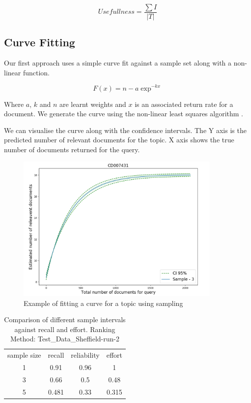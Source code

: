 \begin{equation}
Usefullness = \frac{\sum{I}}{|T|}
\end{equation}
\fi


\subsection{Curve Fitting}

Our first approach uses a simple curve fit against a sample set along with a non-linear function.

\begin{equation}
F(x) = n - a\exp^{-kx}
\end{equation}

Where $a$, $k$ and $n$ are learnt weights and $x$ is an associated return rate for a document. We generate the curve using the non-linear least squares algorithm \cite{leastsqures}. 

We can visualise the curve along with the confidence intervals. The Y axis is the predicted number of relevant documents for the topic. X axis shows the true number of documents returned for the query. 

\begin{figure}[H]
\center
\includegraphics[width=10cm]{figures/curve_fit_example.png}
\caption{Example of fitting a curve for a topic using sampling}
\end{figure}

\begin{table}[H]
\centering
\begin{tabular}{|c|c|c|c|} 

 \hline
 sample size & recall & reliability & effort  \\ 
 1 & 0.91 &	0.96	&	1 \\ 
 3 & 0.66 & 0.5	&	0.48 \\ 
 5 & 0.481 & 0.33	&	0.315 \\ 
 \hline
\end{tabular}
\caption{Comparison of different sample intervals against recall and effort. Ranking Method: Test\_Data\_Sheffield-run-2 \cite{Alharbi2017}}

\end{table}

